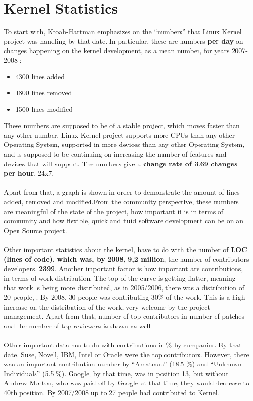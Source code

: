\documentclass[11pt]{article}
\begin{document}
\section{Kernel Statistics}
To start with, Kroah-Hartman emphasizes on the ``numbers'' that Linux Kernel project was handling by that date. In particular, these are numbers \textbf{per day} on changes happening on the kernel development, as a mean number, for years 2007-2008 :
\begin{itemize}\itemsep0pt
\item{4300 lines added}
\item{1800 lines removed}
\item{1500 lines modified}
\end{itemize}
These numbers are supposed to be of a stable project, which moves faster than any other number. Linux Kernel project supports more CPUs than any other Operating System, supported in more devices than any other Operating System, and is supposed to be continuing on increasing the number of features and devices that will support. The numbers give a \textbf{change rate of 3.69 changes per hour}, 24x7.\\
\\
Apart from that, a graph is shown in order to demonstrate the amount of lines added, removed and modified.From the community perspective, these numbers are meaningful of the state of the project, how important it is in terms of community and how flexible, quick and fluid software development can be on an Open Source project.\\
\\
Other important statistics about the kernel, have to do with the number of \textbf{LOC (lines of code), which was, by 2008, 9,2 million}, the number of contributors developers, \textbf{2399}. Another important factor is how important are contributions, in terms of work distribution. The top of the curve is getting flatter, meaning that work is being more distributed, as in 2005/2006, there was a distribution of 20 people, . By 2008, 30 people was contributing 30\% of the work. This is a high increase on the distribution of the work, very welcome by the project management. Apart from that, number of top contributors in number of patches and the number of top reviewers is shown as well.\\
\\
Other important data has to do with contributions in \% by companies. By that date, Suse, Novell, IBM, Intel or Oracle were the top contributors. However, there was an important contribution number by ``Amateurs'' (18.5 \%) and ``Unknown Individuals'' (5.5 \%). Google, by that time, was in position 13, but without Andrew Morton, who was paid off by Google at that time, they would decrease to 40th position. By 2007/2008 up to 27 people had contributed to Kernel.
\end{document}
